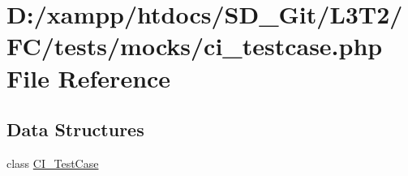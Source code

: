 \hypertarget{tests_2mocks_2ci__testcase_8php}{}\section{D\+:/xampp/htdocs/\+S\+D\+\_\+\+Git/\+L3\+T2/\+F\+C/tests/mocks/ci\+\_\+testcase.php File Reference}
\label{tests_2mocks_2ci__testcase_8php}
\subsection*{Data Structures}
\begin{DoxyCompactItemize}
\item 
class \hyperlink{class_c_i___test_case}{C\+I\+\_\+\+Test\+Case}
\end{DoxyCompactItemize}
